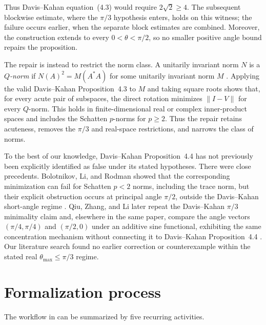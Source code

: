 \documentclass{article}
\begin{document}
Thus Davis--Kahan equation~(4.3) would require $2\sqrt{2}\geq4$. The subsequent blockwise
estimate, where the $\pi/3$ hypothesis enters, holds on this witness; the
failure occurs earlier, when the separate block estimates are combined.
Moreover, the construction extends to every $0<\theta<\pi/2$, so no smaller
positive angle bound repairs the proposition.

The repair is instead to restrict the norm class. A unitarily invariant norm
$N$ is a \emph{$Q$-norm} if
$N(A)^2=M(A^*A)$ for some unitarily invariant norm $M$
\citep{bolotnikov2001minimal}. Applying the valid Davis--Kahan
Proposition~4.3 to $M$ and taking square roots shows that, for every acute pair
of subspaces, the direct rotation minimizes $\lVert I-V\rVert$ for every
$Q$-norm. This holds in finite-dimensional real or complex inner-product
spaces and includes the Schatten $p$-norms for $p\geq2$. Thus the repair
retains acuteness, removes the $\pi/3$ and real-space restrictions, and narrows
the class of norms.

To the best of our knowledge, Davis--Kahan Proposition~4.4 has not previously
been explicitly identified as false under its stated hypotheses. There were
close precedents. Bolotnikov, Li, and Rodman showed that the corresponding
minimization can fail for Schatten $p<2$ norms, including the trace norm, but
their explicit obstruction occurs at principal angle $\pi/2$, outside the
Davis--Kahan short-angle regime \citep{bolotnikov2001minimal}. Qiu, Zhang, and
Li later repeat the Davis--Kahan $\pi/3$ minimality claim and, elsewhere in the
same paper, compare the angle vectors $(\pi/4,\pi/4)$ and $(\pi/2,0)$ under an
additive sine functional, exhibiting the same concentration mechanism without
connecting it to Davis--Kahan Proposition~4.4 \citep{qiu2006grassmann}. Our
literature search found no earlier correction or counterexample within the
stated real $\theta_{\max}\leq\pi/3$ regime.


\section{Formalization process}
\label{sec:system}

The workflow in  can be summarized by five recurring
activities.  
\end{document}
